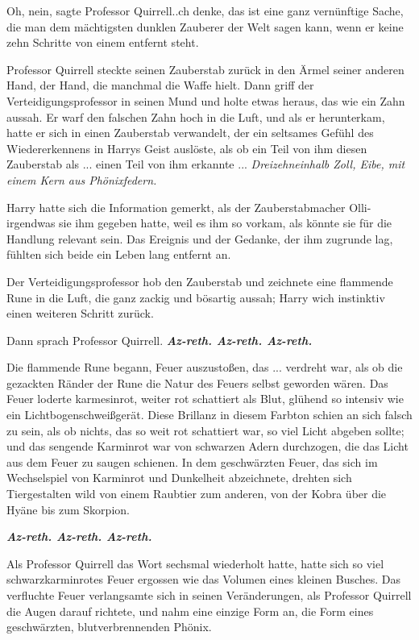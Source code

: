 \glqq{}Oh, nein\grqq{}, sagte Professor Quirrell.\grqq{}.ch denke, das ist eine
ganz vernünftige Sache, die man dem mächtigsten dunklen Zauberer der Welt sagen
kann, wenn er keine zehn Schritte von einem entfernt steht.\grqq{}

Professor Quirrell steckte seinen Zauberstab zurück in den Ärmel seiner anderen
Hand, der Hand, die manchmal die Waffe hielt. Dann griff der
Verteidigungsprofessor in seinen Mund und holte etwas heraus, das wie ein Zahn
aussah. Er warf den falschen Zahn hoch in die Luft, und als er herunterkam,
hatte er sich in einen Zauberstab verwandelt, der ein seltsames Gefühl des
Wiedererkennens in Harrys Geist auslöste, als ob ein Teil von ihm diesen
Zauberstab als ... einen Teil von ihm erkannte ... \emph{Dreizehneinhalb Zoll,
Eibe, mit einem Kern aus Phönixfedern.}

Harry hatte sich die Information gemerkt, als der Zauberstabmacher
Olli-irgendwas sie ihm gegeben hatte, weil es ihm so vorkam, als könnte sie für
die Handlung relevant sein. Das Ereignis und der Gedanke, der ihm zugrunde lag,
fühlten sich beide ein Leben lang entfernt an.

Der Verteidigungsprofessor hob den Zauberstab und zeichnete eine flammende Rune
in die Luft, die ganz zackig und bösartig aussah; Harry wich instinktiv einen
weiteren Schritt zurück.

Dann sprach Professor Quirrell. \glqq{}\textbf{\emph{Az-reth. Az-reth.
Az-reth.}}\grqq{}

Die flammende Rune begann, Feuer auszustoßen, das ... verdreht war, als ob die
gezackten Ränder der Rune die Natur des Feuers selbst geworden wären. Das Feuer
loderte karmesinrot, weiter rot schattiert als Blut, glühend so intensiv wie ein
Lichtbogenschweißgerät. Diese Brillanz in diesem Farbton schien an sich falsch
zu sein, als ob nichts, das so weit rot schattiert war, so viel Licht abgeben
sollte; und das sengende Karminrot war von schwarzen Adern durchzogen, die das
Licht aus dem Feuer zu saugen schienen. In dem geschwärzten Feuer, das sich im
Wechselspiel von Karminrot und Dunkelheit abzeichnete, drehten sich
Tiergestalten wild von einem Raubtier zum anderen, von der Kobra über die Hyäne
bis zum Skorpion.

\glqq{}\textbf{\emph{Az-reth. Az-reth. Az-reth.}}\grqq{}

Als Professor Quirrell das Wort sechsmal wiederholt hatte, hatte sich so viel
schwarzkarminrotes Feuer ergossen wie das Volumen eines kleinen Busches. Das
verfluchte Feuer verlangsamte sich in seinen Veränderungen, als Professor
Quirrell die Augen darauf richtete, und nahm eine einzige Form an, die Form
eines geschwärzten, blutverbrennenden Phönix.

